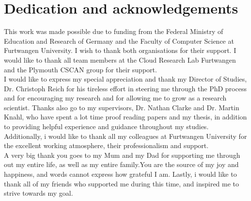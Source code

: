 %
%

\chapter*{Dedication and acknowledgements}
\begin{SingleSpace}
This work was made possible due to funding from the Federal Ministry of Education and Research of Germany and the Faculty of Computer Science at Furtwangen University. I wish to thank both organisations for their support. I would like to thank all team members at the Cloud Research Lab Furtwangen and the Plymouth CSCAN group for their support.\\

I would like to express my special appreciation and thank my Director of Studies, Dr. Christoph Reich for his tireless effort in steering me through the PhD process and for encouraging my research and for allowing me to grow as a research scientist.  Thanks also go to my supervisors, Dr. Nathan Clarke and Dr. Martin Knahl, who have spent a lot time proof reading papers and my thesis, in addition to providing helpful experience and guidance throughout my studies.  Additionally, i would like to thank all my colleagues at Furtwangen University for the excellent working atmosphere, their professionalism and support. \\

A very big thank you goes to my Mum and my Dad  for supporting me through out my entire life, as well as my entire family.You are the source of my joy and happiness, and words cannot express how grateful I am. Lastly, i would  like to thank all of my friends who supported me during this time, and inspired me to strive towards my goal. 
\end{SingleSpace}
\clearpage

